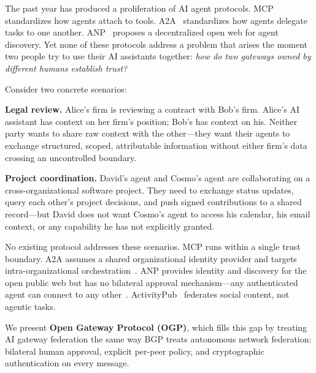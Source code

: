 \documentclass[sigconf,nonacm]{acmart}
\begin{document}
The past year has produced a proliferation of AI agent protocols.
MCP~\cite{mcp2024} standardizes how agents attach to tools.
A2A~\cite{a2a2025} standardizes how agents delegate tasks to one another.
ANP~\cite{anp2024} proposes a decentralized open web for agent discovery.
Yet none of these protocols address a problem that arises the moment two
people try to use their AI assistants together: \emph{how do two gateways
owned by different humans establish trust?}

Consider two concrete scenarios:

\vspace{0.3em}
\noindent\textbf{Legal review.} Alice's firm is reviewing a contract with
Bob's firm. Alice's AI assistant has context on her firm's position; Bob's
has context on his. Neither party wants to share raw context with the
other---they want their agents to exchange structured, scoped, attributable
information without either firm's data crossing an uncontrolled boundary.

\vspace{0.3em}
\noindent\textbf{Project coordination.} David's agent and Cosmo's agent are
collaborating on a cross-organizational software project. They need to
exchange status updates, query each other's project decisions, and push
signed contributions to a shared record---but David does not want Cosmo's
agent to access his calendar, his email context, or any capability he has
not explicitly granted.

\vspace{0.3em}

No existing protocol addresses these scenarios.
MCP runs within a single trust boundary.
A2A assumes a shared organizational identity provider and targets
intra-organizational orchestration~\cite{survey2025}.
ANP provides identity and discovery for the open public web but has no
bilateral approval mechanism---any authenticated agent can connect to any
other~\cite{anp2024}.
ActivityPub~\cite{activitypub2018} federates social content, not agentic tasks.

We present \textbf{Open Gateway Protocol (OGP)}, which fills this gap by
treating AI gateway federation the same way BGP treats autonomous network
federation: bilateral human approval, explicit per-peer policy, and
cryptographic authentication on every message.
\end{document}
